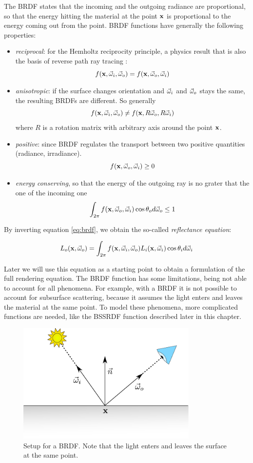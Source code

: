 The BRDF states that the incoming and the outgoing radiance are proportional, so that the energy hitting the material at the point $\mathbf{x}$ is proportional to the energy coming out from the point. BRDF functions have generally the following properties:

\begin{itemize}
	\item \emph{reciprocal}: for the Hemholtz reciprocity principle, a physics result that is also the basis of reverse path ray tracing \citep{Desolneux:2007:GTI:1557413}:
	$$
	f(\mathbf{x}, \vec{\omega}_i, \vec{\omega}_o) = f(\mathbf{x}, \vec{\omega}_o, \vec{\omega}_i)
	$$
	\item \emph{anisotropic}: if the surface changes orientation and $\vec{\omega}_i$ and $\vec{\omega}_o$ stays the same, the resulting BRDFs are different. So generally
	$$
	f(\mathbf{x}, \vec{\omega}_i, \vec{\omega}_o) \neq f(\mathbf{x}, R \vec{\omega}_o, R \vec{\omega}_i)
	$$
	where $R$ is a rotation matrix with arbitrary axis around the point $\mathbf{x}$.
	\item \emph{positive}: since BRDF regulates the transport between two positive quantities (radiance, irradiance). 
	$$
	f(\mathbf{x}, \vec{\omega}_o, \vec{\omega}_i) \ge 0
	$$
	\item \emph{energy conserving}, so that the energy of the outgoing ray is no grater that the one of the incoming one 
	$$
	\int_{2\pi}  f(\mathbf{x}, \vec{\omega}_o, \vec{\omega}_i) \cos\theta_o d\vec{\omega}_o \le 1
	$$
\end{itemize}

By inverting equation \ref{eq:brdf}, we obtain the so-called \emph{reflectance equation}:

$$
L_o(\mathbf{x}, \vec{\omega}_o) = \int_{2\pi} f(\mathbf{x}, \vec{\omega}_i, \vec{\omega}_o) L_i(\mathbf{x}, \vec{\omega}_i) \cos\theta_i d\vec{\omega}_i
$$

Later we will use this equation as a starting point to obtain a formulation of the full rendering equation. The BRDF function has some limitations, being not able to account for all phenomena. For example, with a BRDF it is not possible to account for subsurface scattering, because it assumes the light enters and leaves the material at the same point. To model these phenomena, more complicated functions are needed, like the BSSRDF function described later in this chapter. 

\begin{figure}[!ht]
\centering
\includegraphics[width=0.8\textwidth]{images/brdf.pdf}
\caption{Setup for a BRDF. Note that the light enters and leaves the surface at the same point.}
\label{fig:brdf}
\end{figure}
 

